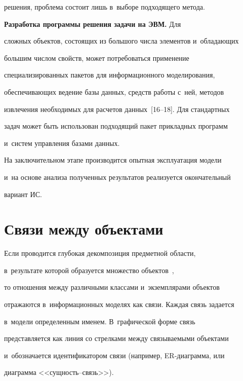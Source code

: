 решения, проблема состоит лишь в~выборе подходящего метода.


    


    \textbf{Разработка программы решения задачи на ЭВМ.} Для 


сложных объектов, состоящих из большого числа элементов и~обладающих 


большим числом свойств, может потребоваться применение 


специализированных пакетов для информационного моделирования, 


обеспечивающих ведение базы данных, средств работы с~ней, методов 


извлечения необходимых для расчетов данных~[16--18]. Для стандартных 


задач может быть использован подходящий пакет прикладных программ 


и~систем управления базами данных.


    


    На заключительном этапе производится опытная эксплуатация модели 


и~на основе анализа полученных результатов реализуется окончательный 


вариант ИС.





\section{Связи между объектами}





    Если проводится глубокая декомпозиция предметной области, 


в~результате которой образуется множество объектов~\cite{17-luk, 18-luk}, 


то отношения между различными классами и~экземплярами объектов 


отражаются в~информационных моделях как связи. Каждая связь задается 


в~модели определенным именем. В~графической форме связь 


представляется как линия со стрелками между связываемыми объектами 


и~обозначается идентификатором связи (например, ER-диа\-грам\-ма, или 


диаграмма <<сущ\-ность--связь>>).


